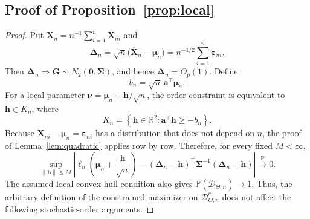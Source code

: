 \documentclass[11pt]{article}
\theoremstyle{remark}
\begin{document}
\subsection{Proof of Proposition~\ref{prop:local}}
\begin{proof}
Put $\overline{\boldsymbol{X}}_n=n^{-1}\sum_{i=1}^n\boldsymbol{X}_{ni}$ and
$$\boldsymbol{\Delta}_n=\sqrt{n}\bigl(\overline{\boldsymbol{X}}_n-\boldsymbol{\mu}_n\bigr)=n^{-1/2}\sum_{i=1}^n\boldsymbol{\varepsilon}_{ni}.$$
Then $\boldsymbol{\Delta}_n\Rightarrow\boldsymbol{G}\sim N_2(\boldsymbol{0},\boldsymbol{\Sigma})$, and hence $\boldsymbol{\Delta}_n=O_p(1)$. Define
$$b_n=\sqrt{n}\,\boldsymbol{a}^{\top}\boldsymbol{\mu}_n.$$
For a local parameter $\boldsymbol{\nu}=\boldsymbol{\mu}_n+\boldsymbol{h}/\sqrt{n}$, the order constraint is equivalent to $\boldsymbol{h}\in K_n$, where
$$K_n=\left\{\boldsymbol{h}\in\mathbb{R}^2:\boldsymbol{a}^{\top}\boldsymbol{h}\geq-b_n\right\}.$$
Because $\boldsymbol{X}_{ni}-\boldsymbol{\mu}_n=\boldsymbol{\varepsilon}_{ni}$ has a distribution that does not depend on $n$, the proof of Lemma~\ref{lem:quadratic} applies row by row. Therefore, for every fixed $M<\infty$,
$$\sup_{\|\boldsymbol{h}\|\leq M}\left|\ell_n\left(\boldsymbol{\mu}_n+\frac{\boldsymbol{h}}{\sqrt{n}}\right)-(\boldsymbol{\Delta}_n-\boldsymbol{h})^{\top}\boldsymbol{\Sigma}^{-1}(\boldsymbol{\Delta}_n-\boldsymbol{h})\right|\xrightarrow{\mathbb{P}}0.$$
The assumed local convex-hull condition also gives $\mathbb{P}(\mathcal{D}_{\Theta,n})\to1$. Thus, the arbitrary definition of the constrained maximizer on $\mathcal{D}_{\Theta,n}^{c}$ does not affect the following stochastic-order arguments.


\end{proof}
\end{document}
